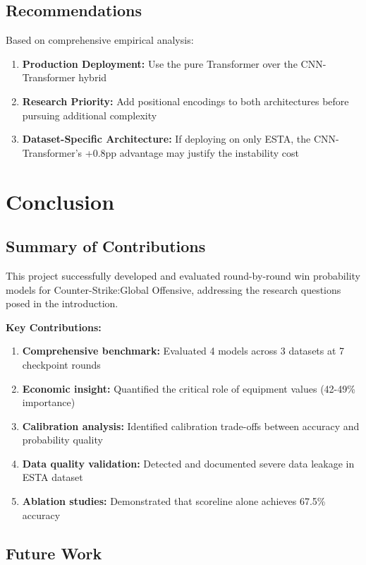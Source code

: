 \documentclass[11pt]{article}
\begin{document}
\subsection{Recommendations}

Based on comprehensive empirical analysis:
\begin{enumerate}
    \item \textbf{Production Deployment:} Use the pure Transformer over the CNN-Transformer hybrid
    \item \textbf{Research Priority:} Add positional encodings to both architectures before pursuing additional complexity
    \item \textbf{Dataset-Specific Architecture:} If deploying on only ESTA, the CNN-Transformer's +0.8pp advantage may justify the instability cost
\end{enumerate}

\clearpage

\section{Conclusion}
\label{sec:conclusion}

\subsection{Summary of Contributions}

This project successfully developed and evaluated round-by-round win probability models for Counter-Strike:Global Offensive, addressing the research questions posed in the introduction.

\textbf{Key Contributions:}
\begin{enumerate}
    \item \textbf{Comprehensive benchmark:} Evaluated 4 models across 3 datasets at 7 checkpoint rounds
    \item \textbf{Economic insight:} Quantified the critical role of equipment values (42-49\% importance)
    \item \textbf{Calibration analysis:} Identified calibration trade-offs between accuracy and probability quality
    \item \textbf{Data quality validation:} Detected and documented severe data leakage in ESTA dataset
    \item \textbf{Ablation studies:} Demonstrated that scoreline alone achieves 67.5\% accuracy
\end{enumerate}

\subsection{Future Work}
\end{document}
